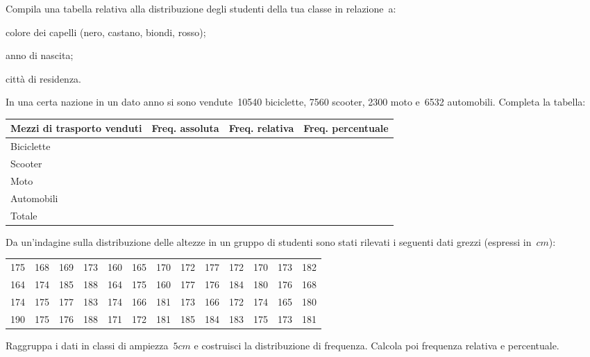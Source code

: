 \subsubsection*{}

\begin{esercizio}
\label{ese:A.2}
Compila una tabella relativa alla distribuzione degli studenti della tua 
classe in relazione~a:
\begin{itemize*}
\item colore dei capelli (nero, castano, biondi, rosso);
\item anno di nascita;
\item città di residenza.
\end{itemize*}
\end{esercizio}

\begin{esercizio}
\label{ese:A.3}
In una certa nazione in un dato anno si sono vendute~10540 biciclette, 7560 
scooter, 2300 moto e~6532 automobili. Completa la tabella:
\begin{center}
 \begin{tabularx}{.9\textwidth}{Xccc}
\toprule
Mezzi di trasporto venduti & Freq. assoluta & Freq. relativa & Freq. 
percentuale \\
\midrule
Biciclette & & & \\
Scooter & & & \\
Moto & & & \\
Automobili & & & \\
\midrule
Totale & & & \\
\bottomrule
\end{tabularx}
\end{center}
\end{esercizio}

\begin{esercizio}
\label{ese:A.4}
Da un'indagine sulla distribuzione delle altezze in un gruppo di studenti 
sono stati rilevati i seguenti dati grezzi (espressi in~\(\unit{cm}\)):
\begin{center}
 \begin{tabular}{ccccccccccccc}
175 & 168 & 169 & 173 & 160 & 165 & 170 & 172 & 177 & 172 & 170 & 173 & 182 
\\
164 & 174 & 185 & 188 & 164 & 175 & 160 & 177 & 176 & 184 & 180 & 176 & 168 
\\
174 & 175 & 177 & 183 & 174 & 166 & 181 & 173 & 166 & 172 & 174 & 165 & 180 
\\
190 & 175 & 176 & 188 & 171 & 172 & 181 & 185 & 184 & 183 & 175 & 173 & 181 
\\
 \end{tabular}
\end{center}
Raggruppa i dati in classi di ampiezza~\(5 \unit{cm}\) e costruisci la 
distribuzione di frequenza. Calcola poi frequenza relativa e percentuale.
\end{esercizio}

